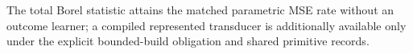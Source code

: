 The total Borel statistic attains the matched parametric MSE rate without an outcome learner; a compiled represented transducer is additionally available only under the explicit bounded-build obligation and shared primitive records.